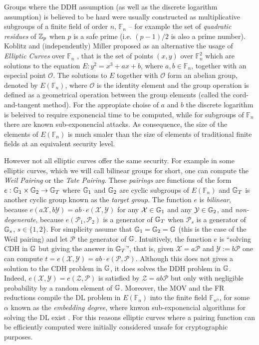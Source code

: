 Groups where the DDH assumption (as well as the discrete logarithm assumption) is believed to be hard were usually constructed as multiplicative subgroups of a finite field of order $n$, $\mathbb{F}_n$ -- for example the set of \emph{quadratic residues} of $\mathbb{Z}_p$ when $p$ is a safe prime (i.e. $(p-1)/2$ is also a prime number).
Koblitz and (independently) Miller proposed as an alternative the usage of \emph{Elliptic Curves} over $\mathbb{F}_n$ \cite{MOC:Koblitz87,C:Miller85}, that is the set of points $(x,y)$ over $\mathbb{F}_n^2$ which are solutions to the equation $E:y^2=x^3+ax+b$, where $a,b\in\mathbb{F}_n$, together with an especial point $\mathcal{O}$. The solutions to $E$ together with $\mathcal{O}$ form an abelian group, denoted by $E(\mathbb{F}_n)$, where $\mathcal{O}$ is the identity element and the group operation is defined as a geometrical operation between the group elements (called the cord-and-tangent method). For the appropiate choise of $a$ and $b$ the discrete logarithm is beleived to require exponencial time to be computed, while for subgroups of $\mathbb{F}_n$  there are known sub-exponencial attacks. As consequence, the size of the elements of $E(\mathbb{F}_n)$ is much smaler than the size of elements of traditional finite fields at an equivalent security level.

However not all elliptic curves offer the same security. For example in some elliptic curves, which we will call bilinear groups for short, one can compute the \emph{Weil Pairing} or the \emph{Tate Pairing}. These \emph{pairings} are functions of the form $e:\mathbb{G}_1\times\mathbb{G}_2\to\mathbb{G}_T$ where $\mathbb{G}_1$ and $\mathbb{G}_2$ are cyclic subgroups of $E(\mathbb{F}_n)$ and $\mathbb{G}_T$ is another cyclic group known as the \emph{target group}. The function $e$ is \emph{bilinear}, because $e(a\mathcal{X},b\mathcal{Y})=ab\cdot e(\mathcal{X},\mathcal{Y})$ for any $\mathcal{X}\in\mathbb{G}_1$ and any $\mathcal{Y}\in\mathbb{G}_2$, and \emph{non-degenerate}, because $e(\mathcal{P}_1,\mathcal{P}_2)$ is a generator of $\mathbb{G}_T$ when $\mathcal{P}_s$ is a generator of $\mathbb{G}_s$, $s\in\{1,2\}$. For simplicity assume that $\mathbb{G}_1=\mathbb{G}_2=\mathbb{G}$ (this is the case of the Weil pairing) and let $\mathcal{P}$ the generator of $\mathbb{G}$. Intuitively, the function $e$ is ``solving CDH in $\mathbb{G}$ but giving the answer in $\mathbb{G}_T$'', that is, given $\mathcal{X}=a\mathcal{P}$ and $\mathcal{Y}:=b\mathcal{P}$ one can compute $t=e(\mathcal{X},\mathcal{Y})=ab\cdot e(\mathcal{P},\mathcal{P})$. Although this does not gives a solution to the CDH problem in $\mathbb{G}$, it does solves the DDH problem in $\mathbb{G}$. Indeed, $e(\mathcal{X},\mathcal{Y})=e(\mathcal{Z},\mathcal{P})$ is satisfied by $\mathcal{Z}=ab\mathcal{P}$ but only with negligible probability by a random element of $\mathbb{G}$. 
Moreover, the MOV and the FR reductions compile the DL problem in $E(\mathbb{F}_n)$ into the finite field $\mathbb{F}_{n^\alpha}$, for some $\alpha$ known as the \emph{embedding degree}, where knwon sub-exponencial algorithms for solving the DL exist \cite{STOC:MenVanOka91,MOC:FreRuc94}.
For this reasons elliptic curves where a pairing function can be efficiently computed were initially considered unsafe for cryptographic purposes.

